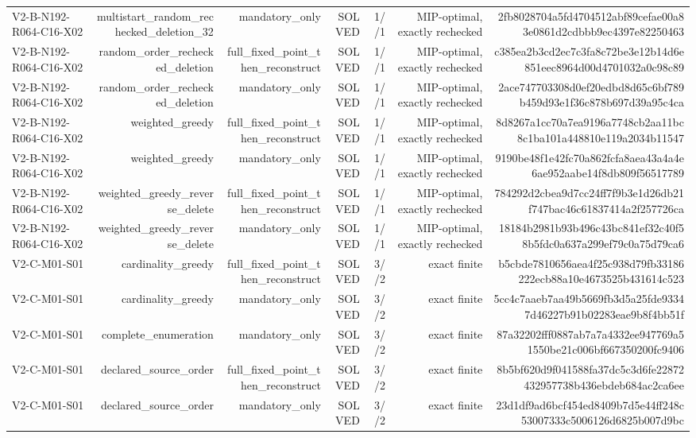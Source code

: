 {\begin{longtable}{lrrrrrr}
V2-B-N192-R064-C16-X02 & multistart\_random\_rechecked\_deletion\_32 & mandatory\_only & SOLVED & 1//1 & MIP-optimal, exactly rechecked & 2fb8028704a5fd4704512abf89cefae00a83e0861d2cdbbb9ec4397e82250463 \\
V2-B-N192-R064-C16-X02 & random\_order\_rechecked\_deletion & full\_fixed\_point\_then\_reconstruct & SOLVED & 1//1 & MIP-optimal, exactly rechecked & c385ea2b3cd2ec7c3fa8c72be3e12b14d6e851eec8964d00d4701032a0c98c89 \\
V2-B-N192-R064-C16-X02 & random\_order\_rechecked\_deletion & mandatory\_only & SOLVED & 1//1 & MIP-optimal, exactly rechecked & 2ace747703308d0ef20edbd8d65c6bf789b459d93e1f36c878b697d39a95c4ca \\
V2-B-N192-R064-C16-X02 & weighted\_greedy & full\_fixed\_point\_then\_reconstruct & SOLVED & 1//1 & MIP-optimal, exactly rechecked & 8d8267a1cc70a7ea9196a7748cb2aa11bc8c1ba101a448810e119a2034b11547 \\
V2-B-N192-R064-C16-X02 & weighted\_greedy & mandatory\_only & SOLVED & 1//1 & MIP-optimal, exactly rechecked & 9190be48f1e42fc70a862fcfa8aea43a4a4e6ae952aabe14f8db809f56517789 \\
V2-B-N192-R064-C16-X02 & weighted\_greedy\_reverse\_delete & full\_fixed\_point\_then\_reconstruct & SOLVED & 1//1 & MIP-optimal, exactly rechecked & 784292d2cbea9d7cc24ff7f9b3e1d26db21f747bac46c61837414a2f257726ca \\
V2-B-N192-R064-C16-X02 & weighted\_greedy\_reverse\_delete & mandatory\_only & SOLVED & 1//1 & MIP-optimal, exactly rechecked & 18184b2981b93b496c43bc841ef32c40f58b5fdc0a637a299ef79c0a75d79ca6 \\
V2-C-M01-S01 & cardinality\_greedy & full\_fixed\_point\_then\_reconstruct & SOLVED & 3//2 & exact finite & b5cbde7810656aea4f25c938d79fb33186222ecb88a10e4673525b431614c523 \\
V2-C-M01-S01 & cardinality\_greedy & mandatory\_only & SOLVED & 3//2 & exact finite & 5cc4c7aaeb7aa49b5669fb3d5a25fde93347d46227b91b02283eae9b8f4bb51f \\
V2-C-M01-S01 & complete\_enumeration & mandatory\_only & SOLVED & 3//2 & exact finite & 87a32202fff0887ab7a7a4332ee947769a51550be21c006bf667350200fc9406 \\
V2-C-M01-S01 & declared\_source\_order & full\_fixed\_point\_then\_reconstruct & SOLVED & 3//2 & exact finite & 8b5bf620d9f041588fa37dc5c3d6fe22872432957738b436ebdeb684ac2ca6ee \\
V2-C-M01-S01 & declared\_source\_order & mandatory\_only & SOLVED & 3//2 & exact finite & 23d1df9ad6bcf454ed8409b7d5e44ff248c53007333c5006126d6825b007d9bc \\

\end{longtable}}

